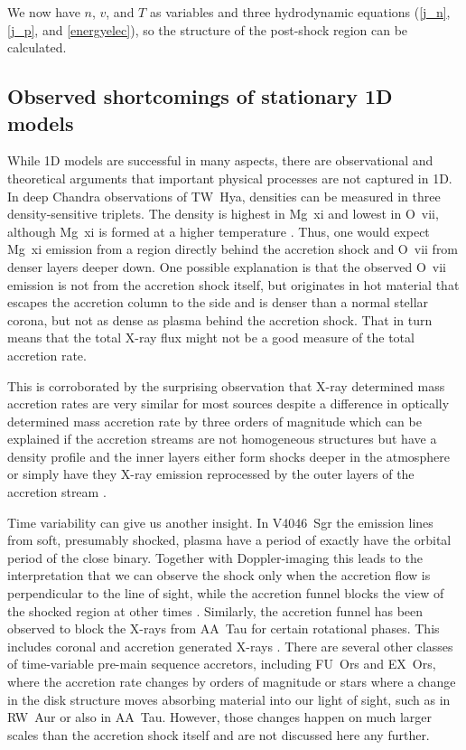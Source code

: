 We now have $n$, $v$, and $T$ as variables and three hydrodynamic equations (\ref{j_n}, \ref{j_p}, and \ref{energyelec}), so the structure of the post-shock region can be calculated.


\subsection{Observed shortcomings of stationary 1D models}
While 1D models are successful in many aspects, there are observational and theoretical arguments that important physical processes are not captured in 1D. In deep Chandra observations of TW~Hya, densities can be measured in three density-sensitive triplets. The density is highest in Mg~{\sc xi} and lowest in O~{\sc vii}, although Mg~{\sc xi} is formed at a higher temperature \cite{Brickhouse_2010}. Thus, one would expect Mg~{\sc xi} emission from a region directly behind the accretion shock and O~{\sc vii} from denser layers deeper down. One possible explanation is that the observed O~{\sc vii} emission is not from the accretion shock itself, but originates in hot material that escapes the accretion column to the side and is denser than a normal stellar corona, but not as dense as plasma behind the accretion shock. That in turn means that the total X-ray flux might not be a good measure of the total accretion rate. 

This is corroborated by the surprising observation that X-ray determined mass accretion rates are very similar for most sources despite a difference in optically determined mass accretion rate by three orders of magnitude \cite{2011A&A...526A.104C} which can be explained if the accretion streams are not homogeneous structures but have a density profile and the inner layers either form shocks deeper in the atmosphere or simply have they X-ray emission reprocessed by the outer layers of the accretion stream \cite{2018A&A...618A..55S,2021Natur.597...41E}.

Time variability can give us another insight. In V4046~Sgr the emission lines from soft, presumably shocked, plasma have a period of exactly have the orbital period of the close binary. Together with Doppler-imaging this leads to the interpretation that we can observe the shock only when the accretion flow is perpendicular to the line of sight, while the accretion funnel blocks the view of the shocked region at other times \cite{2012ApJ...752..100A}. Similarly, the accretion funnel has been observed to block the X-rays from AA~Tau for certain rotational phases. This includes coronal and accretion generated X-rays \cite{2007A&A...462L..41S,2007A&A...475..607G}. 
There are several other classes of time-variable pre-main sequence accretors, including FU~Ors and EX~Ors, where the accretion rate changes by orders of magnitude or stars where a change in the disk structure moves absorbing material into our light of sight, such as in RW~Aur or also in AA~Tau. However, those changes happen on much larger scales than the accretion shock itself and are not discussed here any further.


